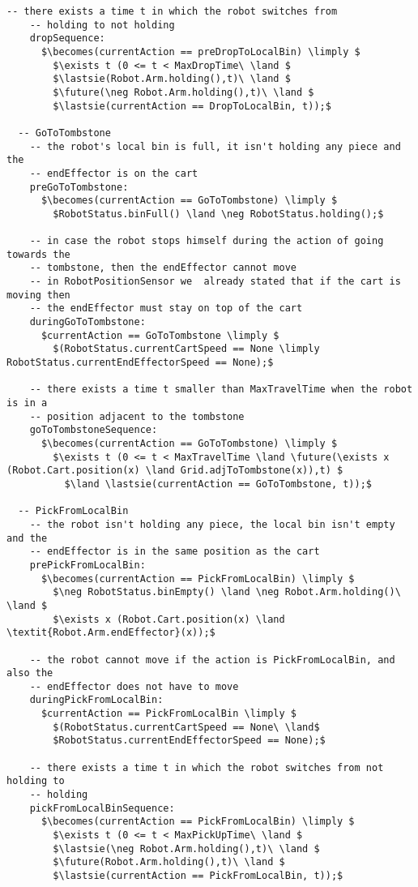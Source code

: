 \begin{lstlisting}[fontadjust, mathescape, frame=single]
    -- there exists a time t in which the robot switches from 
    -- holding to not holding
    dropSequence:
      $\becomes(currentAction == preDropToLocalBin) \limply $
        $\exists t (0 <= t < MaxDropTime\ \land $
        $\lastsie(Robot.Arm.holding(),t)\ \land $
        $\future(\neg Robot.Arm.holding(),t)\ \land $
        $\lastsie(currentAction == DropToLocalBin, t));$
  
  -- GoToTombstone
    -- the robot's local bin is full, it isn't holding any piece and the 
    -- endEffector is on the cart
    preGoToTombstone:
      $\becomes(currentAction == GoToTombstone) \limply $
        $RobotStatus.binFull() \land \neg RobotStatus.holding();$
    
    -- in case the robot stops himself during the action of going towards the 
    -- tombstone, then the endEffector cannot move 
    -- in RobotPositionSensor we  already stated that if the cart is moving then 
    -- the endEffector must stay on top of the cart
    duringGoToTombstone:
      $currentAction == GoToTombstone \limply $
        $(RobotStatus.currentCartSpeed == None \limply RobotStatus.currentEndEffectorSpeed == None);$

    -- there exists a time t smaller than MaxTravelTime when the robot is in a 
    -- position adjacent to the tombstone
    goToTombstoneSequence:
      $\becomes(currentAction == GoToTombstone) \limply $
        $\exists t (0 <= t < MaxTravelTime \land \future(\exists x (Robot.Cart.position(x) \land Grid.adjToTombstone(x)),t) $
          $\land \lastsie(currentAction == GoToTombstone, t));$

  -- PickFromLocalBin
    -- the robot isn't holding any piece, the local bin isn't empty and the 
    -- endEffector is in the same position as the cart
    prePickFromLocalBin:
      $\becomes(currentAction == PickFromLocalBin) \limply $
        $\neg RobotStatus.binEmpty() \land \neg Robot.Arm.holding()\ \land $
        $\exists x (Robot.Cart.position(x) \land \textit{Robot.Arm.endEffector}(x));$
    
    -- the robot cannot move if the action is PickFromLocalBin, and also the 
    -- endEffector does not have to move
    duringPickFromLocalBin:
      $currentAction == PickFromLocalBin \limply $
        $(RobotStatus.currentCartSpeed == None\ \land$
        $RobotStatus.currentEndEffectorSpeed == None);$
  
    -- there exists a time t in which the robot switches from not holding to 
    -- holding
    pickFromLocalBinSequence:
      $\becomes(currentAction == PickFromLocalBin) \limply $
        $\exists t (0 <= t < MaxPickUpTime\ \land $
        $\lastsie(\neg Robot.Arm.holding(),t)\ \land $
        $\future(Robot.Arm.holding(),t)\ \land $
        $\lastsie(currentAction == PickFromLocalBin, t));$


\end{lstlisting}
